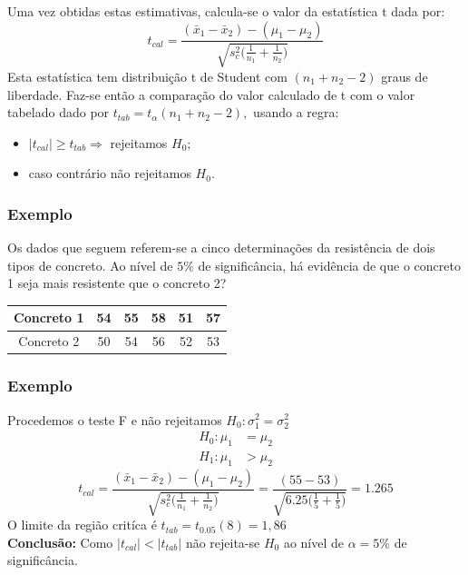 \documentclass[14pt,aspectratio=1610]{beamer}
\newcommand{\bx}{\ensuremath{\bar{x}}}
\newcommand{\Ho}{\ensuremath{H_{0}}}
\begin{document}
\begin{frame}{}
\frametitle{}
\begin{block}{}
\justifying
Uma vez obtidas estas estimativas, calcula-se o valor da estatística 
t dada por:
$$t_{cal}=\dfrac{(\bx_{1}-\bx_{2})-(\mu_{1}-\mu_{2})}{\sqrt{s_{c}^{2}\Biggl(\frac{1}{n_{1}}+\frac{1}{n_{2}}\Biggl)}}$$ 
Esta estatística tem distribuição t de Student com $(n_{1}+n_{2}-2)$ graus de liberdade. Faz-se então a comparação do valor 
calculado de t com o valor tabelado dado por $t_{tab}=t_{\alpha}(n_{1}+n_{2}-2),$ usando a regra:
\begin{itemize}
\item $|t_{cal}|\geq t_{tab}\Rightarrow$ rejeitamos $\Ho;$
\item caso contrário não rejeitamos $\Ho.$
\end{itemize}
\end{block}
\end{frame}

\begin{frame}{}
\frametitle{Exemplo}
\begin{block}{}
\justifying
Os dados que seguem referem-se a cinco determinações da resistência de dois tipos de concreto. Ao nível de $5\%$ de significância, há evidência de que o concreto 
1 seja mais resistente que o concreto 2?
\begin{table}[]
\begin{tabular}{c|ccccc}
Concreto 1 & 54 & 55 & 58 & 51 & 57 \\ \hline
Concreto 2 & 50 & 54 & 56 & 52 & 53
\end{tabular}
\end{table}
\end{block}
\end{frame}

\begin{frame}{}
\frametitle{Exemplo}
\begin{block}{}
{\bf *}Procedemos o teste F e não rejeitamos $\Ho:\sigma_{1}^{2}=\sigma_{2}^{2}$
\justifying
\begin{align*}
H_{0}: \mu_{1}&=\mu_{2} \\ 
H_{1}: \mu_{1}&> \mu_{2}
\end{align*}
$$t_{cal}=\dfrac{(\bx_{1}-\bx_{2})-(\mu_{1}-\mu_{2})}{\sqrt{s_{c}^{2}\Biggl(\frac{1}{n_{1}}+\frac{1}{n_{2}}\Biggl)}}=
                 \dfrac{(55-53)}{\sqrt{6.25\Biggl(\frac{1}{5}+\frac{1}{5}\Biggl)}}=1.265$$
O limite da região critíca é $t_{tab}=t_{0.05}(8)=1,86$\\
\textbf{Conclusão:} Como $|t_{cal}|<|t_{tab}|$ não rejeita-se $\Ho$ ao nível de $\alpha=5\%$ de significância.
\end{block}
\end{frame}
\end{document}
